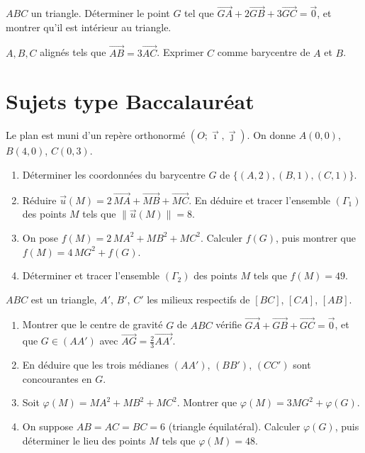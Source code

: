 \exo{} $ABC$ un triangle. Déterminer le point $G$ tel que $\overrightarrow{GA}+2\overrightarrow{GB}+3\overrightarrow{GC}=\vec0$, et montrer qu'il est intérieur au triangle.

\exo{} $A,B,C$ alignés tels que $\overrightarrow{AB}=3\overrightarrow{AC}$. Exprimer $C$ comme barycentre de $A$ et $B$.

\section{Sujets type Baccalauréat}

Le plan est muni d'un repère orthonormé $(O;\vec\imath,\vec\jmath)$. On donne $A(0,0)$, $B(4,0)$, $C(0,3)$.
\begin{enumerate}[label=\arabic*)]
\item Déterminer les coordonnées du barycentre $G$ de $\{(A,2),(B,1),(C,1)\}$.
\item Réduire $\vec u(M)=2\,\overrightarrow{MA}+\overrightarrow{MB}+\overrightarrow{MC}$. En déduire et tracer l'ensemble $(\Gamma_1)$ des points $M$ tels que $\|\vec u(M)\|=8$.
\item On pose $f(M)=2\,MA^{2}+MB^{2}+MC^{2}$. Calculer $f(G)$, puis montrer que $f(M)=4\,MG^{2}+f(G)$.
\item Déterminer et tracer l'ensemble $(\Gamma_2)$ des points $M$ tels que $f(M)=49$.
\end{enumerate}

$ABC$ est un triangle, $A'$, $B'$, $C'$ les milieux respectifs de $[BC]$, $[CA]$, $[AB]$.
\begin{enumerate}[label=\arabic*)]
\item Montrer que le centre de gravité $G$ de $ABC$ vérifie $\overrightarrow{GA}+\overrightarrow{GB}+\overrightarrow{GC}=\vec0$, et que $G\in(AA')$ avec $\overrightarrow{AG}=\frac23\overrightarrow{AA'}$.
\item En déduire que les trois médianes $(AA')$, $(BB')$, $(CC')$ sont concourantes en $G$.
\item Soit $\varphi(M)=MA^2+MB^2+MC^2$. Montrer que $\varphi(M)=3MG^2+\varphi(G)$.
\item On suppose $AB=AC=BC=6$ (triangle équilatéral). Calculer $\varphi(G)$, puis déterminer le lieu des points $M$ tels que $\varphi(M)=48$.
\end{enumerate}

